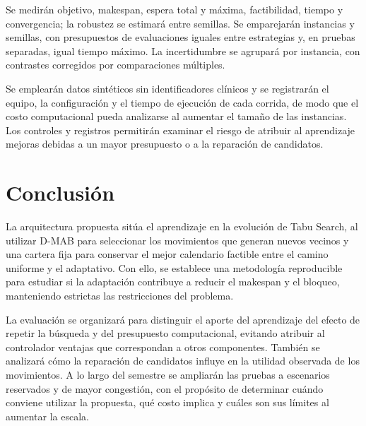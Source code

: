 \documentclass[12pt,letterpaper]{report}
\begin{document}
Se medirán objetivo, makespan, espera total y máxima, factibilidad, tiempo y
convergencia; la robustez se estimará entre semillas. Se emparejarán instancias
y semillas, con presupuestos de evaluaciones iguales entre estrategias y,
en pruebas separadas, igual tiempo máximo. La incertidumbre se agrupará por
instancia, con contrastes corregidos por comparaciones múltiples.

Se emplearán datos sintéticos sin identificadores clínicos y se registrarán
el equipo, la configuración y el tiempo de ejecución de cada corrida,
de modo que el costo computacional pueda analizarse al aumentar el tamaño
de las instancias. Los controles y registros permitirán examinar el riesgo
de atribuir al aprendizaje mejoras debidas a un mayor presupuesto o a la
reparación de candidatos.

\clearpage
\section{Conclusión}
La arquitectura propuesta sitúa el aprendizaje en la evolución de Tabu
Search, al utilizar D-MAB para seleccionar los movimientos que generan
nuevos vecinos y una cartera fija para conservar el mejor calendario
factible entre el camino uniforme y el adaptativo. Con ello, se establece
una metodología reproducible para estudiar si la adaptación contribuye a
reducir el makespan y el bloqueo, manteniendo estrictas las restricciones
del problema.

La evaluación se organizará para distinguir el aporte del aprendizaje
del efecto de repetir la búsqueda y del presupuesto computacional,
evitando atribuir al controlador ventajas que correspondan a otros
componentes. También se analizará cómo la reparación de candidatos
influye en la utilidad observada de los movimientos. A lo largo del
semestre se ampliarán las pruebas a escenarios reservados y de mayor
congestión, con el propósito de determinar cuándo conviene utilizar la
propuesta, qué costo implica y cuáles son sus límites al aumentar la escala.

\clearpage
\printbibliography[title={Referencias}]
\end{document}
